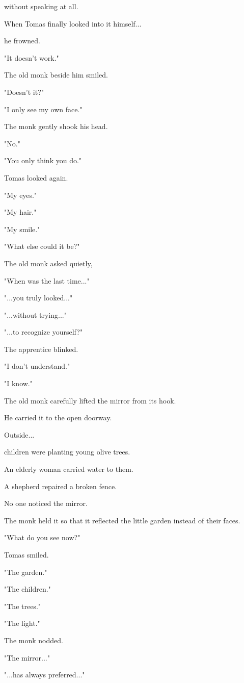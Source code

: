\documentclass[12pt,openany]{book}
\begin{document}
without speaking at all.

When Tomas finally looked into it himself...

he frowned.

"It doesn't work."

The old monk beside him smiled.

"Doesn't it?"

"I only see my own face."

The monk gently shook his head.

"No."

"You only think you do."

Tomas looked again.

"My eyes."

"My hair."

"My smile."

"What else could it be?"

The old monk asked quietly,

"When was the last time..."

"...you truly looked..."

"...without trying..."

"...to recognize yourself?"

The apprentice blinked.

"I don't understand."

"I know."

The old monk carefully lifted the mirror from its hook.

He carried it to the open doorway.

Outside...

children were planting young olive trees.

An elderly woman carried water to them.

A shepherd repaired a broken fence.

No one noticed the mirror.

The monk held it so that it reflected the little garden instead of their faces.

"What do you see now?"

Tomas smiled.

"The garden."

"The children."

"The trees."

"The light."

The monk nodded.

"The mirror..."

"...has always preferred..."
\end{document}
